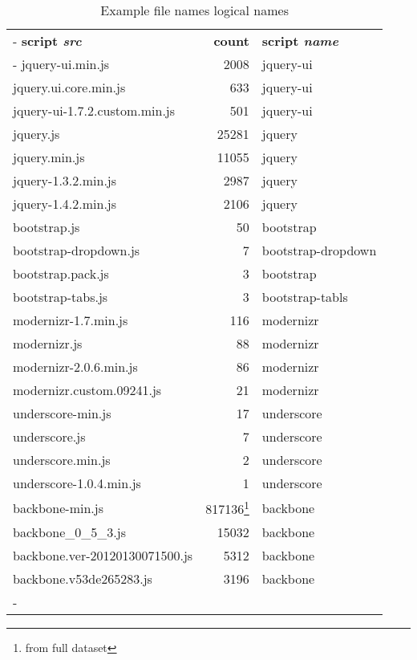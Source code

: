 \documentclass[11pt,a4paper,oneside]{scrartcl}
\begin{document}
\begin{table}
	\begin{tabu} to 0.9
		\tabucline-
		\rowfont{\normalfont\bfseries}
		\textbf{script \emph{src}} & \textbf{count} & \textbf{script \emph{name}} \\
		\tabucline-
		jquery-ui.min.js				&	2008	&	jquery-ui \\
		jquery.ui.core.min.js   		&	633		&	jquery-ui \\
		jquery-ui-1.7.2.custom.min.js	&	501		&	jquery-ui \\
		jquery.js	   					&	25281	&	jquery \\
		jquery.min.js   				&	11055	&	jquery \\
		jquery-1.3.2.min.js	 			&	2987	&	jquery \\
		jquery-1.4.2.min.js	 			&	2106	&	jquery \\
		bootstrap.js					&	50 		&	bootstrap \\
		bootstrap-dropdown.js			&	7		&	bootstrap-dropdown \\
		bootstrap.pack.js				&	3		&	bootstrap \\
		bootstrap-tabs.js				&	3		&	bootstrap-tabls \\
		modernizr-1.7.min.js			&	116		&	modernizr \\
		modernizr.js					&	88		&	modernizr \\
		modernizr-2.0.6.min.js			&	86		&	modernizr \\
		modernizr.custom.09241.js   	&	21 		&	modernizr \\
		underscore-min.js				& 	17		&	underscore \\
		underscore.js					& 	7		&	underscore \\
		underscore.min.js				& 	2 		&	underscore \\
		underscore-1.0.4.min.js 		&	1 		&	underscore \\
		backbone-min.js					&	817136\footnote{\label{tab:note_full}from full dataset}	&	backbone \\
		backbone\_0\_5\_3.js			&	15032	&	backbone \\
		backbone.ver-20120130071500.js	&	5312	&	backbone \\
		backbone.v53de265283.js			&	3196	&	backbone \\
		\tabucline-
	\end{tabu}
	\caption{Example file names logical names\label{tab:example_names}}
\end{table}
\end{document}
